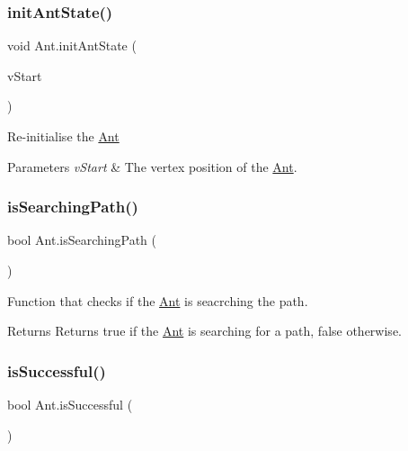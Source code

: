 \subsubsection{\texorpdfstring{init\+Ant\+State()}{initAntState()}}
{\footnotesize\ttfamily void Ant.\+init\+Ant\+State (\begin{DoxyParamCaption}\item[{\hyperlink{classVertexNode}{Vertex\+Node}}]{v\+Start }\end{DoxyParamCaption})\hspace{0.3cm}{\ttfamily [inline]}}



Re-\/initialise the \hyperlink{classAnt}{Ant} 


\begin{DoxyParams}{Parameters}
{\em v\+Start} & The vertex position of the \hyperlink{classAnt}{Ant}.\\
\hline
\end{DoxyParams}
\mbox{\label{classAnt_acd0b755b859a34440750cf7a74d421e9}} 
\subsubsection{\texorpdfstring{is\+Searching\+Path()}{isSearchingPath()}}
{\footnotesize\ttfamily bool Ant.\+is\+Searching\+Path (\begin{DoxyParamCaption}{ }\end{DoxyParamCaption})\hspace{0.3cm}{\ttfamily [inline]}}



Function that checks if the \hyperlink{classAnt}{Ant} is seacrching the path. 

\begin{DoxyReturn}{Returns}
Returns true if the \hyperlink{classAnt}{Ant} is searching for a path, false otherwise.
\end{DoxyReturn}
\mbox{\label{classAnt_aa60ce1095d0872a98c732a924c567281}} 
\subsubsection{\texorpdfstring{is\+Successful()}{isSuccessful()}}
{\footnotesize\ttfamily bool Ant.\+is\+Successful (\begin{DoxyParamCaption}{ }\end{DoxyParamCaption})\hspace{0.3cm}{\ttfamily [inline]}}



